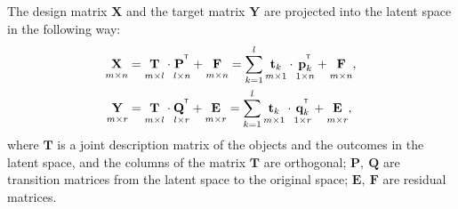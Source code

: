 \documentclass[preprint,12pt]{elsarticle}
\newcommand{\bY}{\mathbf{Y}}
\newcommand{\bX}{\mathbf{X}}
\newcommand{\bt}{\mathbf{t}}
\newcommand{\bp}{\mathbf{p}}
\newcommand{\bq}{\mathbf{q}}
\newcommand{\bP}{\mathbf{P}}
\newcommand{\bT}{\mathbf{T}}
\newcommand{\bQ}{\mathbf{Q}}
\newcommand{\bE}{\mathbf{E}}
\newcommand{\bF}{\mathbf{F}}
\newcommand{\T}{^{\text{\tiny\sffamily\upshape\mdseries T}}}
\begin{document}
The design matrix $\bX$ and the target matrix $\bY$ are projected into the latent space in the following way:
\begin{align}
\label{eq::PLS_X}
\underset{m \times n}{\vphantom{\bQ}\bX} 
&= \underset{m \times l}{\vphantom{\bQ}\bT} \cdot \underset{l \times n}{\vphantom{\bQ}\bP^{\T}} + \underset{m \times n}{\vphantom{\bQ}\bF} 
= \sum_{k=1}^l \underset{m \times 1}{\vphantom{\bp_k^{\T}}\bt_k} \cdot \underset{1 \times n}{\bp_k^{\T}} + \underset{m \times n}{\vphantom{\bp_k^{\T}}\bF},\\
\label{eq::PLS_Y}
\underset{m \times r}{\vphantom{\bQ}\bY} 
&= \underset{m \times l}{\vphantom{\bQ}\bT} \cdot \underset{l \times r}{\bQ^{\T}} + \underset{m \times r}{\vphantom{\bQ}\bE}
=  \sum_{k=1}^l  \underset{m \times 1}{\vphantom{\bq_k^{\T}}\bt_k} \cdot \underset{1 \times r}{\bq_k^{\T}} +  \underset{m \times r}{\vphantom{\bq_k^{\T}}\bE},
\end{align}
where $\bT$ is a joint description matrix of the objects and the outcomes in the latent space, and the columns of the matrix $\bT$ are orthogonal; $\bP,\ \bQ$ are transition matrices from the latent space to the original space; $\bE,\ \bF$ are residual matrices.
\end{document}
